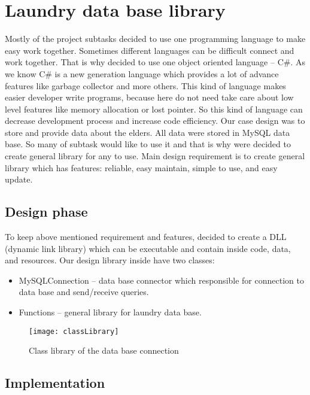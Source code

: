%
\section{Laundry data base library}

Mostly of the project subtasks decided to use one programming language to make easy work together. Sometimes different languages can be difficult connect and work together. That is why decided to use one object oriented language – C\#. As we know C\# is a new generation language which provides a lot of advance features like garbage collector and more others. This kind of language makes easier developer write programs, because here do not need take care about low level features like memory allocation or lost pointer. So this kind of language can decrease development process and increase code efficiency. 
Our case design was to store and provide data about the elders. All data were stored in MySQL data base. So many of subtask would like to use it and that is why were decided to create general library for any to use. Main design requirement is to create general library which has features:  reliable, easy maintain, simple to use, and easy update.

\subsection{Design phase}

To keep above mentioned requirement and features, decided to create a DLL (dynamic link library) which can be executable and contain inside code, data, and resources. Our design library inside have two classes:

\begin{itemize}
	\item MySQLConnection – data base connector which responsible for connection to data base and send/receive queries.
	\item Functions – general library for laundry data base.
\end{itemize}

\begin{figure}[h]
	\centering
		\texttt{[image: classLibrary]}
	\caption{Class library of the data base connection}
	\label{fig:planning}
\end{figure}

\subsection{Implementation}

